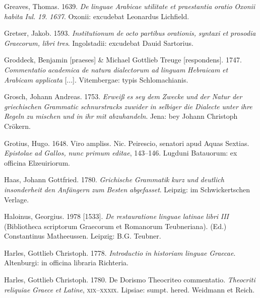 \documentclass[output=paper]{langsci/langscibook}
\begin{document}
Greaves, Thomas. 1639. \textit{De} \textit{linguae} \textit{Arabicae} \textit{utilitate} \textit{et} \textit{praestantia} \textit{oratio} \textit{Oxonii} \textit{habita} \textit{Iul.} \textit{19.} \textit{1637}. Oxonii: excudebat Leonardus Lichfield.

Gretser, Jakob. 1593. \textit{Institutionum} \textit{de} \textit{octo} \textit{partibus} \textit{orationis,} \textit{syntaxi} \textit{et} \textit{prosodia} \textit{Graecorum,} \textit{libri} \textit{tres}. Ingolstadii: excudebat Dauid Sartorius.

Groddeck, Benjamin [praeses] \& Michael Gottlieb Treuge [respondens]. 1747. \textit{Commentatio} \textit{academica} \textit{de} \textit{natura} \textit{dialectorum} \textit{ad} \textit{linguam} \textit{Hebraicam} \textit{et} \textit{Arabicam} \textit{applicata} [...]. Vitembergae: typis Schlomachianis.

Grosch, Johann Andreas. 1753. \textit{Erweiß} \textit{es} \textit{sey} \textit{dem} \textit{Zwecke} \textit{und} \textit{der} \textit{Natur} \textit{der} \textit{griechischen} \textit{Grammatic} \textit{schnurstracks} \textit{zuwider} \textit{in} \textit{selbiger} \textit{die} \textit{Dialecte} \textit{unter} \textit{ihre} \textit{Regeln} \textit{zu} \textit{mischen} \textit{und} \textit{in} \textit{ihr} \textit{mit} \textit{abzuhandeln}. Jena: bey Johann Christoph Crökern.

Grotius, Hugo. 1648. Viro ampliss. Nic. Peirescio, senatori apud Aquas Sextias. \textit{Epistolae} \textit{ad} \textit{Gallos,} \textit{nunc} \textit{primum} \textit{editae}, 143–146. Lugduni Batauorum: ex officina Elzeuiriorum.

Haas, Johann Gottfried. 1780. \textit{Grichische} \textit{Grammatik} \textit{kurz} \textit{und} \textit{deutlich} \textit{insonderheit} \textit{den} \textit{Anfängern} \textit{zum} \textit{Besten} \textit{abgefasset}. Leipzig: im Schwickertschen Verlage.

Haloinus, Georgius. 1978 [1533]. \textit{De} \textit{restauratione} \textit{linguae} \textit{latinae} \textit{libri} \textit{III} (Bibliotheca scriptorum Graecorum et Romanorum Teubneriana). (Ed.) Constantinus Matheeussen. Leipzig: B.G. Teubner.

Harles, Gottlieb Christoph. 1778. \textit{Introductio} \textit{in} \textit{historiam} \textit{linguae} \textit{Graecae}. Altenburgi: in officina libraria Richteria.

Harles, Gottlieb Christoph. 1780. De Dorismo Theocriteo commentatio. \textit{Theocriti} \textit{reliquiae} \textit{Graece} \textit{et} \textit{Latine}, \textsc{xix}–\textsc{xxxix}. Lipsiae: sumpt. hered. Weidmann et Reich.
\end{document}

